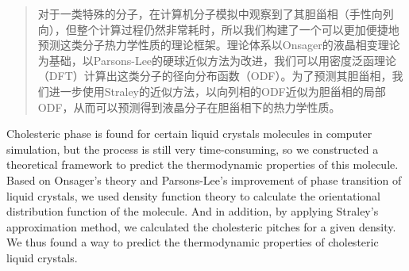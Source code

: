 
\begin{abstract}
	对于一类特殊的分子，在计算机分子模拟中观察到了其胆甾相（手性向列向），但整个计算过程仍然非常耗时，所以我们构建了一个可以更加便捷地预测这类分子热力学性质的理论框架。理论体系以Onsager的液晶相变理论为基础，以Parsons-Lee的硬球近似方法为改进，我们可以用密度泛函理论（DFT）计算出这类分子的径向分布函数（ODF）。为了预测其胆甾相，我们进一步使用Straley的近似方法，以向列相的ODF近似为胆甾相的局部ODF，从而可以预测得到液晶分子在胆甾相下的热力学性质。
\end{abstract}

\begin{enabstract}
  Cholesteric phase is found for certain liquid crystals molecules in computer simulation, but the process is still very time-consuming, so we constructed a theoretical framework to predict the thermodynamic properties of this molecule. Based on Onsager’s theory and Parsons-Lee’s improvement of phase transition of liquid crystals, we used density function theory to calculate the orientational distribution function of the molecule. And in addition, by applying Straley’s approximation method, we calculated the cholesteric pitches for a given density. We thus found a way to predict the thermodynamic properties of cholesteric liquid crystals.
\end{enabstract}
